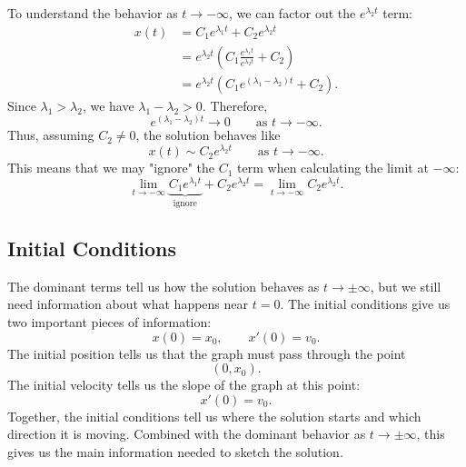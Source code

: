 \documentclass[10pt,letterpaper]{article}
\begin{document}
To understand the behavior as $t\to-\infty$, we can factor out the
$e^{\lambda_2t}$ term:
\begin{align*}
    x(t) &= C_1e^{\lambda_1t}+C_2e^{\lambda_2t}\\
         &= e^{\lambda_2t}
            \left(C_1\frac{e^{\lambda_1t}}{e^{\lambda_2t}}+C_2\right)\\
         &= e^{\lambda_2t}
            \left(C_1e^{(\lambda_1-\lambda_2)t}+C_2\right).
\end{align*}
Since $\lambda_1>\lambda_2$, we have $\lambda_1-\lambda_2>0$. Therefore,
\[
e^{(\lambda_1-\lambda_2)t}\to0
\qquad\text{as }t\to-\infty.
\]
Thus, assuming $C_2\neq0$, the solution behaves like
\[
x(t)\sim C_2e^{\lambda_2t}
\qquad\text{as }t\to-\infty.
\]
This means that we may "ignore" the $C_1$ term when calculating the limit at $-\infty$:
$$ 
    \lim_{t\to-\infty} \underbrace{C_1e^{\lambda_1t}}_{\text{ignore}} + C_2 e^{\lambda_2t} = \lim_{t\to-\infty} C_2 e^{\lambda_2 t}.
$$

\subsection{Initial Conditions}

The dominant terms tell us how the solution behaves as $t\to\pm\infty$, but we still need information about what happens
near $t=0$. The initial conditions give us two important pieces of
information:
\[
x(0)=x_0,
\qquad
x'(0)=v_0.
\]
The initial position tells us that the graph must pass through the point
\[
(0,x_0).
\]
The initial velocity tells us the slope of the graph at this point:
\[
x'(0)=v_0.
\]
Together, the initial conditions tell us where the solution starts and
which direction it is moving. Combined with the dominant behavior as
$t\to\pm\infty$, this gives us the main information needed to sketch
the solution.

\end{document}
